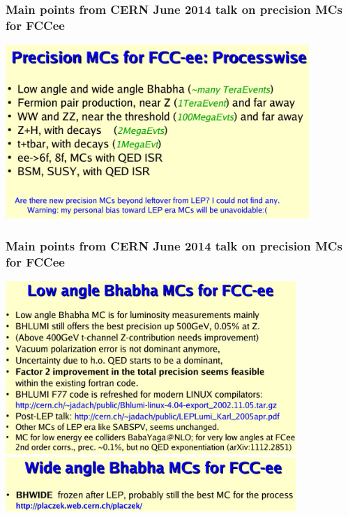 \documentclass{beamer}
\newcommand{\ns}{\normalsize}
\begin{document}
%
\begin{frame}[fragile]
\frametitle{\bf\ns 
 Main points from CERN June 2014 talk on precision MCs for FCCee}

\includegraphics[width=115mm]{./sli2.jpg}
\end{frame}


\begin{frame}[fragile]
\frametitle{\bf\ns 
 Main points from CERN June 2014 talk on precision MCs for FCCee}

\vspace{-2mm}
\includegraphics[width=110mm]{./sli4.jpg}
\includegraphics[width=110mm]{./sli5.jpg}
\end{frame}
\end{document}
